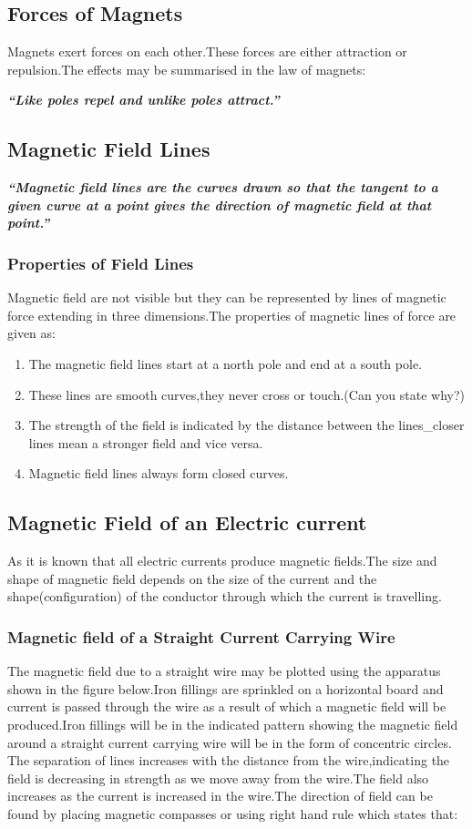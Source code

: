 \subsection{Forces of Magnets}
Magnets exert forces on each other.These forces are either attraction or repulsion.The effects may be summarised in the law of magnets:

\textit{\textbf{“Like poles repel and unlike poles attract.”}}
\subsection{Magnetic Field Lines}
\textit{\textbf{“Magnetic field lines are the curves drawn so that the tangent to a given curve at a point gives the direction of magnetic field at that point.”}}
\subsubsection{Properties of Field Lines}
Magnetic field are not visible but they can be represented by lines of magnetic force extending in three dimensions.The properties of magnetic lines of force are given as:
\begin{enumerate}[label = (\roman*)]
    \item The magnetic field lines start at a north pole and end at a south pole.
    \item These lines are smooth curves,they never cross or touch.(Can you state why?)
    \item The strength of the field is indicated by the distance between the lines\_closer lines mean a stronger field and vice versa.
    \item Magnetic field lines always form closed curves.
\end{enumerate}

\subsection{Magnetic Field of an Electric current}
As it is known that all electric currents produce magnetic fields.The size and shape of magnetic field depends on the size of the current and the shape(configuration) of the conductor through which the current is travelling.

\subsubsection{Magnetic field of a Straight Current Carrying Wire}
The magnetic field due to a straight wire may be plotted using the apparatus shown in the figure below.Iron fillings are sprinkled on a horizontal board and current is passed through the wire as a result of which a magnetic field will be produced.Iron fillings will be in the indicated pattern showing the magnetic field around a straight current carrying wire will be in the form of concentric circles.
The separation of lines increases with the distance from the wire,indicating the field is decreasing in strength as we move away from the wire.The field also increases as the current is increased in the wire.The direction of field can be found by placing magnetic compasses or using right hand rule which states that:

